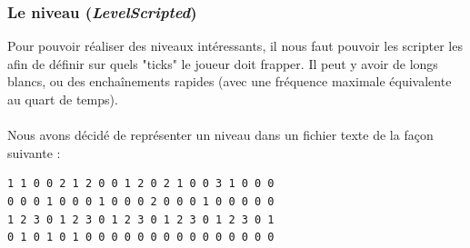 \subsubsection{Le niveau (\textit{LevelScripted})}
\label{niveau}
Pour pouvoir réaliser des niveaux intéressants, il nous faut pouvoir les scripter les afin de définir sur quels "ticks" le joueur doit frapper. Il peut y avoir de longs blancs, ou des enchaînements rapides (avec une fréquence maximale équivalente au quart de temps).
\\\\
Nous avons décidé de représenter un niveau dans un fichier texte de la façon suivante :\\
\begin{lstlisting}
1 1 0 0 2 1 2 0 0 1 2 0 2 1 0 0 3 1 0 0 0
0 0 0 1 0 0 0 1 0 0 0 2 0 0 0 1 0 0 0 0 0
1 2 3 0 1 2 3 0 1 2 3 0 1 2 3 0 1 2 3 0 1
0 1 0 1 0 1 0 0 0 0 0 0 0 0 0 0 0 0 0 0 0
\end{lstlisting}
\paragraph{}

